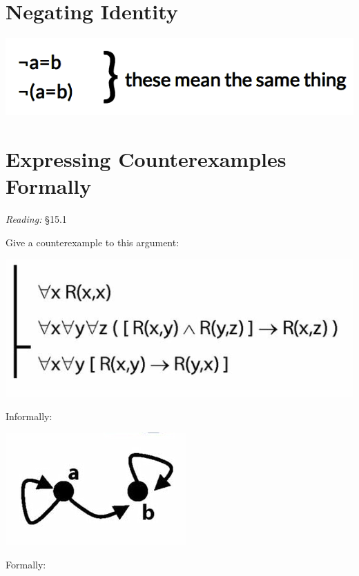 \documentclass[12pt]{extarticle}
\begin{document}
\begin{multicols*}{3}
 
 
\section{Negating Identity}
 
\begin{center}
\includegraphics[scale=0.3]{img/unit_323.png}
\end{center}
 
 
\section{Expressing Counterexamples Formally}
 
\emph{Reading:} §15.1
 
Give a counterexample to this argument:
 
\begin{center}
\includegraphics[scale=0.3]{img/unit_583_argument.png}
\end{center}
Informally:
 
\begin{center}
\includegraphics[scale=0.3]{img/unit_583_counterexample.png}
\end{center}
Formally:
 

\end{multicols*}
\end{document}
